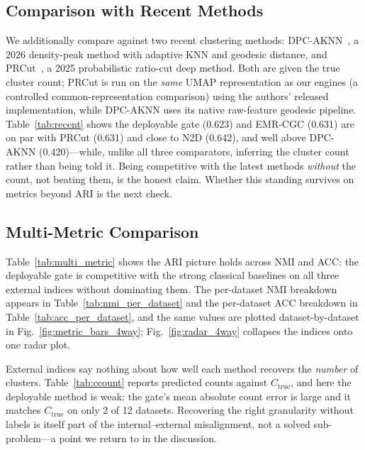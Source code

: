 \documentclass[journal]{IEEEtran}
\begin{document}
\subsection{Comparison with Recent Methods}

We additionally compare against two recent clustering methods: DPC-AKNN~\cite{wang2026density}, a 2026 density-peak method with adaptive KNN and geodesic distance, and PRCut~\cite{ghriss2025prcut}, a 2025 probabilistic ratio-cut deep method. Both are given the true cluster count; PRCut is run on the \emph{same} UMAP representation as our engines (a controlled common-representation comparison) using the authors' released implementation, while DPC-AKNN uses its native raw-feature geodesic pipeline. Table~\ref{tab:recent} shows the deployable gate (0.623) and EMR-CGC (0.631) are on par with PRCut (0.631) and close to N2D (0.642), and well above DPC-AKNN (0.420)---while, unlike all three comparators, inferring the cluster count rather than being told it. Being competitive with the latest methods \emph{without} the count, not beating them, is the honest claim. Whether this standing survives on metrics beyond ARI is the next check.



\subsection{Multi-Metric Comparison}

Table~\ref{tab:multi_metric} shows the ARI picture holds across NMI and ACC: the deployable gate is competitive with the strong classical baselines on all three external indices without dominating them. The per-dataset NMI breakdown appears in Table~\ref{tab:nmi_per_dataset} and the per-dataset ACC breakdown in Table~\ref{tab:acc_per_dataset}, and the same values are plotted dataset-by-dataset in Fig.~\ref{fig:metric_bars_4way}; Fig.~\ref{fig:radar_4way} collapses the indices onto one radar plot.







External indices say nothing about how well each method recovers the \emph{number} of clusters. Table~\ref{tab:ccount} reports predicted counts against $C_{\text{true}}$, and here the deployable method is weak: the gate's mean absolute count error is large and it matches $C_{\text{true}}$ on only 2 of 12 datasets. Recovering the right granularity without labels is itself part of the internal--external misalignment, not a solved sub-problem---a point we return to in the discussion.
\end{document}
